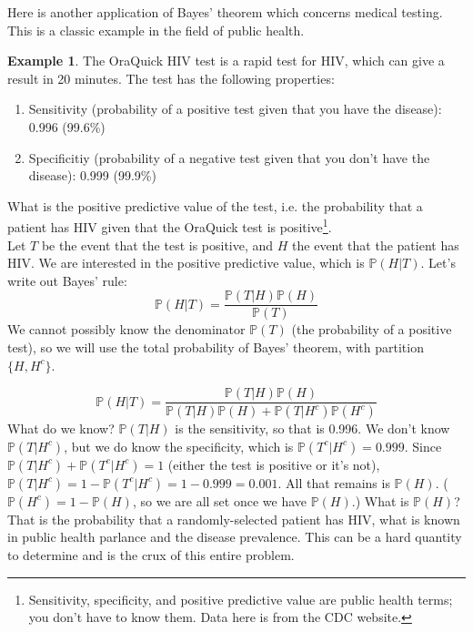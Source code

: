 \documentclass[12pt]{article}
\theoremstyle{definition}
\newtheorem*{example}{Example}
\theoremstyle{remark}
\def\P{{\mathbb P}}
\begin{document}
Here is another application of Bayes' theorem which concerns medical testing. This is a classic example in the field of public health.

\begin{example}
The OraQuick HIV test is a rapid test for HIV, which can give a result in 20 minutes. The test has the following properties:
\begin{enumerate}
\item Sensitivity (probability of a positive test given that you have the disease): 0.996 (99.6\%)
\item Specificitiy (probability of a negative test given that you don't have the disease): 0.999 (99.9\%)
\end{enumerate}
What is the positive predictive value of the test, i.e. the probability that a patient has HIV given that the OraQuick test is positive\footnote{Sensitivity, specificity, and positive predictive value are public health terms; you don't have to know them. Data here is from the CDC website.}.\\

Let $T$ be the event that the test is positive, and $H$ the event that the patient has HIV. We are interested in the positive predictive value, which is $\P(H|T)$. Let's write out Bayes' rule:
\[
\P(H|T) = \frac{ \P(T|H)\P(H)}{ \P(T) }
\]
We cannot possibly know the denominator $\P(T)$ (the probability of a positive test), so we will use the total probability of Bayes' theorem, with partition $\{H, H^c\}$.

\[
\P(H|T) = \frac{ \P(T|H)\P(H)}{ \P(T|H)\P(H) + \P(T|H^c)\P(H^c) }
\]
What do we know? $\P(T|H)$ is the sensitivity, so that is 0.996. We don't know $\P(T|H^c)$, but we do know the specificity, which is $\P(T^c|H^c) = 0.999$. Since $\P(T|H^c) + \P(T^c|H^c) = 1$ (either the test is positive or it's not), $\P(T|H^c) = 1 - \P(T^c|H^c) = 1 - 0.999 = 0.001$. All that remains is $\P(H)$. ($\P(H^c) = 1 - \P(H)$, so we are all set once we have $\P(H)$.) What is $\P(H)$? That is the probability that a randomly-selected patient has HIV, what is known in public health parlance and the disease prevalence. This can be a hard quantity to determine and is the crux of this entire problem.\\


\end{example}
\end{document}
